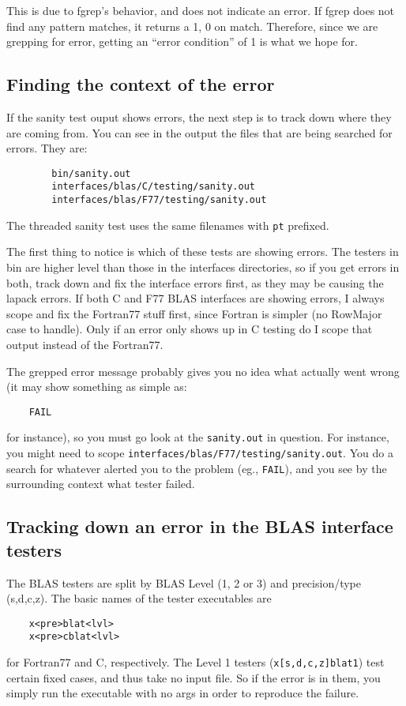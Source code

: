 \documentclass[11pt]{article}
\begin{document}
This is due to fgrep's behavior, and does not indicate an error.  If fgrep
does not find any pattern matches, it returns a 1, 0 on match.  Therefore,
since we are grepping for error, getting an ``error condition'' of 1 is
what we hope for.

\subsection{Finding the context of the error}
If the sanity test ouput shows errors, the next step is to track down where
they are coming from.  You can see in the output the files that are being
searched for errors.  They are:
\begin{verbatim}
        bin/sanity.out
        interfaces/blas/C/testing/sanity.out 
        interfaces/blas/F77/testing/sanity.out 
\end{verbatim}

The threaded sanity test uses the same filenames with {\tt pt} prefixed.

The first thing to notice is which of these tests are showing errors.
The testers in bin are higher level than those in the interfaces directories,
so if you get errors in both, track down and fix the interface errors first,
as they may be causing the lapack errors.  If both C and F77 BLAS interfaces
are showing errors, I always scope and fix the Fortran77 stuff first, since
Fortran is simpler (no RowMajor case to handle).  Only if an error only
shows up in C testing do I scope that output instead of the Fortran77.

The grepped error message probably gives you no idea what actually went wrong
(it may show something as simple as:
\begin{verbatim}
    FAIL
\end{verbatim}
for instance), so you must go look at the {\tt sanity.out} in question.
For instance, you might need to scope
{\tt interfaces/blas/F77/testing/sanity.out}.  You do a search for
whatever alerted you to the problem (eg., {\tt FAIL}), and you see by the
surrounding context what tester failed.

\subsection{Tracking down an error in the BLAS interface testers}
The BLAS testers are split by BLAS Level (1, 2 or 3) and precision/type
(s,d,c,z).  The basic names of the tester executables are 
\begin{verbatim}
    x<pre>blat<lvl>
    x<pre>cblat<lvl>
\end{verbatim}
for Fortran77 and C, respectively.  The Level 1 testers 
({\tt x[s,d,c,z]blat1}) test certain fixed cases, and thus take no input file.
So if the error is in them, you simply run the executable with no args in
order to reproduce the failure.
\end{document}
